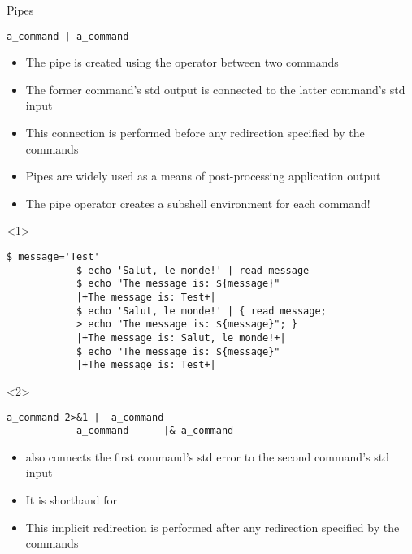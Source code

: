 \begin{frame}[fragile]{Pipes}
    \begin{lstlisting}[style=MyBash, numbers=none, aboveskip=0mm]
        a_command | a_command
    \end{lstlisting}
    \vspace{2mm}
    \begin{itemize}
        \item The pipe is created using the \PB{\texttt{|}} operator between two commands
        \item The former command's std output is connected to the latter command's std input
        \item This connection is performed before any redirection specified by the commands
        \item Pipes are widely used as a means of post-processing application output
        \item \alert{The pipe operator creates a subshell environment for each command!} 
    \end{itemize}
    \begin{onlyenv}<1>
        \begin{lstlisting}[style=MyBash, aboveskip=3mm]
            $ message='Test'
            $ echo 'Salut, le monde!' | read message
            $ echo "The message is: ${message}"
            |+The message is: Test+|
            $ echo 'Salut, le monde!' | { read message;
            > echo "The message is: ${message}"; }
            |+The message is: Salut, le monde!+|
            $ echo "The message is: ${message}"
            |+The message is: Test+|
        \end{lstlisting}
    \end{onlyenv}
    \begin{onlyenv}<2>
        \begin{lstlisting}[style=MyBash, numbers=none, aboveskip=3mm]
            a_command 2>&1 |  a_command
            a_command      |& a_command
        \end{lstlisting}
        \vspace{2mm}
        \begin{itemize}
            \item \PB{\texttt{|\&}} also connects the first command's std error to the second command's std input
            \item It is shorthand for 
            \item This implicit redirection is performed after any redirection specified by the commands
        \end{itemize}
    \end{onlyenv}
\end{frame}
